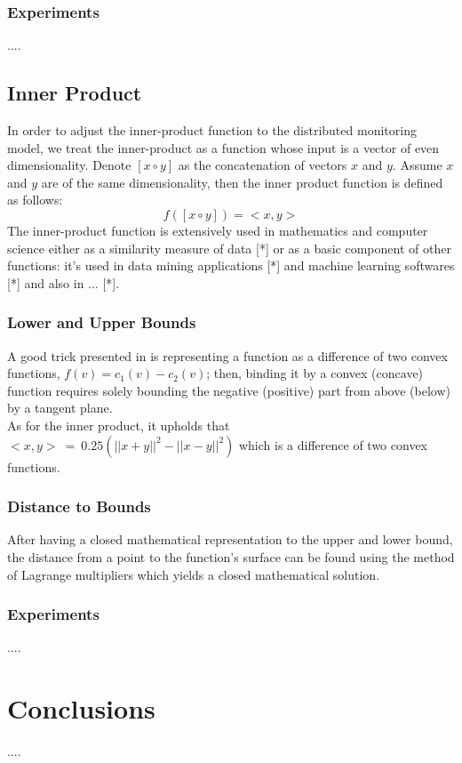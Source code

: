 \documentclass[10pt, conference]{IEEEtran}
\begin{document}
\subsubsection{Experiments}
.... \\
\subsection{Inner Product}
In order to adjust the inner-product function to the distributed monitoring model, we treat the inner-product as a function whose input is a vector of even dimensionality. Denote ${[x \circ y]}$ as the concatenation of vectors $x$ and $y$. Assume $x$ and $y$ are of the same dimensionality, then the inner product function is defined as follows:
\begin{equation}
f([x \circ y]) = <x, y>
\end{equation}
The inner-product function is extensively used in mathematics and computer science either as a similarity measure of data [*] or as a basic component of other functions: it's used in data mining applications [*] and machine learning softwares [*] and also in ... [*]. \\
\subsubsection{Lower and Upper Bounds}
A good trick presented in \cite{lazerson2015monitoring} is representing a function as a difference of two convex functions, ${f(v) = c_1(v)-c_2(v)}$; then, binding it by a convex (concave) function requires solely bounding the negative (positive) part from above (below) by a tangent plane. \\
As for the inner product, it upholds that ${<x,y> \ = \ 0.25(||x+y||^2-||x-y||^2)}$ which is a difference of two convex functions. \\
\subsubsection{Distance to Bounds}
After having a closed mathematical representation to the upper and lower bound, the distance from a point to the function's surface can be found using the method of Lagrange multipliers which yields a closed mathematical solution. \\
\subsubsection{Experiments}
....

\section{Conclusions}
....




\end{document}

